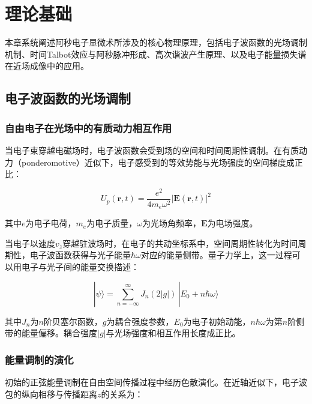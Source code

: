 \chapter{理论基础}
\label{chap:theory}

本章系统阐述阿秒电子显微术所涉及的核心物理原理，包括电子波函数的光场调制机制、时间Talbot效应与阿秒脉冲形成、高次谐波产生原理、以及电子能量损失谱在近场成像中的应用。

\section{电子波函数的光场调制}
\label{sec:electron-modulation}

\subsection{自由电子在光场中的有质动力相互作用}
\label{subsec:ponderomotive}

当电子束穿越电磁场时，电子波函数会受到场的空间和时间周期性调制。在有质动力（ponderomotive）近似下，电子感受到的等效势能与光场强度的空间梯度成正比：

\begin{equation}
    \label{eq:ponderomotive}
    U_p(\mathbf{r}, t) = \frac{e^2}{4 m_e \omega^2} |\mathbf{E}(\mathbf{r}, t)|^2
\end{equation}

其中$e$为电子电荷，$m_e$为电子质量，$\omega$为光场角频率，$\mathbf{E}$为电场强度。

当电子以速度$v_z$穿越驻波场时，在电子的共动坐标系中，空间周期性转化为时间周期性，电子波函数获得与光子能量$\hbar\omega$对应的能量侧带。量子力学上，这一过程可以用电子与光子间的能量交换描述：

\begin{equation}
    \label{eq:sideband}
    |\psi\rangle = \sum_{n=-\infty}^{\infty} J_n(2|g|) \, |E_0 + n\hbar\omega\rangle
\end{equation}

其中$J_n$为$n$阶贝塞尔函数，$g$为耦合强度参数，$E_0$为电子初始动能，$n\hbar\omega$为第$n$阶侧带的能量偏移。耦合强度$|g|$与光场强度和相互作用长度成正比。

\subsection{能量调制的演化}
\label{subsec:energy-modulation}

初始的正弦能量调制在自由空间传播过程中经历色散演化。在近轴近似下，电子波包的纵向相移与传播距离$z$的关系为：

